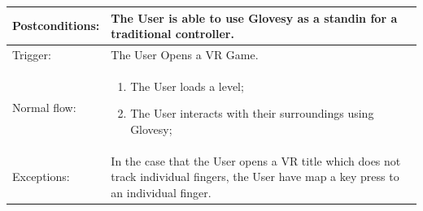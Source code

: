 \documentclass[12pt,a4paper,oneside]{book}
\theoremstyle{plain}
\numberwithin{equation}{chapter}
\begin{document}
\begin{longtable}{| p{3cm} | p{12cm} |}
\hline
Postconditions: & The User is able to use Glovesy as a standin for a traditional controller.\\
\hline
Trigger: & The User Opens a VR Game.\\
\hline
Normal flow: &\mbox{}\par\vspace{-\baselineskip}
\begin{enumerate}
\item The User loads a level;
\item The User interacts with their surroundings using Glovesy;
\end{enumerate}\\
\hline
Exceptions: & In the case that the User opens a VR title which does not track individual fingers, the User have
map a key press to an individual finger.\\
\end{longtable}
\end{document}
